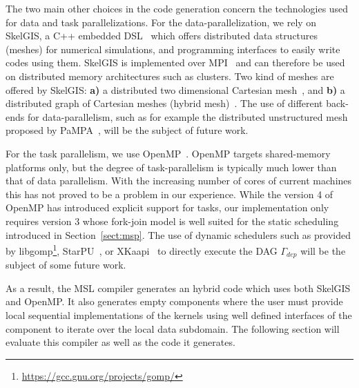 The two main other choices in the code generation concern the technologies used for data and task parallelizations.
For the data-parallelization, we rely on SkelGIS, a C++ embedded DSL~\cite{CPE:CPE3494} which offers distributed data structures (meshes) for numerical simulations, and programming interfaces to easily write codes using them.
SkelGIS is implemented over MPI~\cite{Graham2009MSE} and can therefore be used on distributed memory architectures such as clusters.
Two kind of meshes are offered by SkelGIS: \textbf{a)} a distributed two dimensional Cartesian mesh~\cite{DBLP:conf/ieeehpcs/HeleneS13}, and \textbf{b)} a distributed graph of Cartesian meshes (hybrid mesh)~\cite{DBLP:conf/europar/CoullonL14}.
The use of different back-ends for data-parallelism, such as for example the distributed unstructured mesh proposed by PaMPA~\cite{lachat:hal-00768916}, will be the subject of future work.

For the task parallelism, we use OpenMP~\cite{660313}.
OpenMP targets shared-memory platforms only, but the degree of task-parallelism is typically much lower than that of data parallelism.
With the increasing number of cores of current machines this has not proved to be a problem in our experience. %
While the version 4 of OpenMP has introduced explicit support for tasks, our implementation only requires version 3 whose fork-join model is well suited for the static scheduling introduced in Section~\ref{sect:msp}.
The use of dynamic schedulers such as provided by libgomp\footnote{\url{https://gcc.gnu.org/projects/gomp/}}, StarPU~\cite{Augonnet2011}, or XKaapi~\cite{Gautier:2013:XRS:2510661.2511383} to directly execute the DAG $\Gamma_{dep}$ will be the subject of some future work.

As a result, the MSL compiler generates an hybrid code which uses both SkelGIS and OpenMP.
It also generates empty components where the user must provide local sequential implementations of the kernels using well defined interfaces of the component to iterate over the local data subdomain.
The following section will evaluate this compiler as well as the code it generates.
